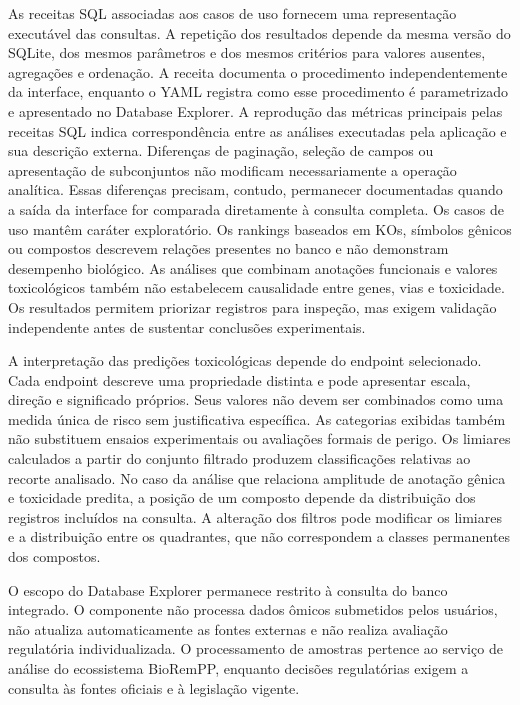 As receitas SQL associadas aos casos de uso fornecem uma representação
executável das consultas. A repetição dos resultados depende da mesma versão
do SQLite, dos mesmos parâmetros e dos mesmos critérios para valores ausentes,
agregações e ordenação. A receita documenta o procedimento independentemente
da interface, enquanto o YAML registra como esse procedimento é parametrizado
e apresentado no Database Explorer. A reprodução das métricas principais pelas receitas SQL indica
correspondência entre as análises executadas pela aplicação e sua descrição
externa. Diferenças de paginação, seleção de campos ou apresentação de
subconjuntos não modificam necessariamente a operação analítica. Essas
diferenças precisam, contudo, permanecer documentadas quando a saída da
interface for comparada diretamente à consulta completa. Os casos de uso mantêm caráter exploratório. Os rankings baseados em KOs,
símbolos gênicos ou compostos descrevem relações presentes no banco e não
demonstram desempenho biológico. As análises que combinam anotações funcionais
e valores toxicológicos também não estabelecem causalidade entre genes, vias e
toxicidade. Os resultados permitem priorizar registros para inspeção, mas
exigem validação independente antes de sustentar conclusões experimentais.

A interpretação das predições toxicológicas depende do endpoint selecionado.
Cada endpoint descreve uma propriedade distinta e pode apresentar escala,
direção e significado próprios. Seus valores não devem ser combinados como uma
medida única de risco sem justificativa específica. As categorias exibidas
também não substituem ensaios experimentais ou avaliações formais de perigo. Os limiares calculados a partir do conjunto filtrado produzem classificações
relativas ao recorte analisado. No caso da análise que relaciona amplitude de
anotação gênica e toxicidade predita, a posição de um composto depende da
distribuição dos registros incluídos na consulta. A alteração dos filtros pode
modificar os limiares e a distribuição entre os quadrantes, que não
correspondem a classes permanentes dos compostos.

O escopo do Database Explorer permanece restrito à consulta do banco
integrado. O componente não processa dados ômicos submetidos pelos usuários,
não atualiza automaticamente as fontes externas e não realiza avaliação
regulatória individualizada. O processamento de amostras pertence ao serviço
de análise do ecossistema BioRemPP, enquanto decisões regulatórias exigem a
consulta às fontes oficiais e à legislação vigente.


